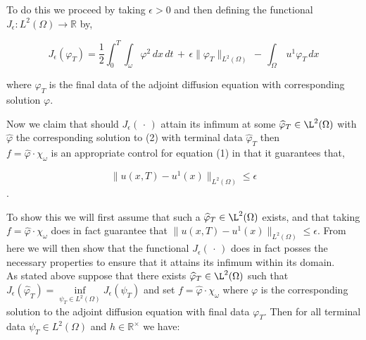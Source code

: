\documentclass[11pt]{article}
\begin{document}
To do this we proceed by taking $\epsilon >0$ and then defining the functional    $J_\epsilon :L^2(\Omega)\rightarrow \mathbb{R}$ by,
  
$$J_\epsilon(\varphi_T)=\dfrac{1}{2}\int_{0}^{T}\int_\omega\varphi^2\,dx\,dt\, +\,\epsilon\lVert \varphi_T \rVert_{L^2(\Omega)}\, -\,\int_\Omega\,u^1\varphi_T\,dx$$

where $\varphi_T$ is the final data of the adjoint diffusion equation with corresponding solution $\varphi$.

Now we claim that should $J_\epsilon (\,\cdot\,)$ attain its infimum at some $\widehat{\varphi}_T \in\L^2(\Omega)$ with $\widehat{\varphi}$ the corresponding solution to (2) with terminal data $\widehat{\varphi}_T$ then\\ $f=\widehat{\varphi} \cdot\chi_\omega$ is an appropriate control for equation (1) in that it guarantees that,

 $$\lVert u(x,T)-u^1(x) \rVert_{L^2(\Omega)}^{} \leq\epsilon$$.

To show this we will first assume that such a $\widehat{\varphi}_T \in\L^2(\Omega)$ exists, and that taking $f=\widehat{\varphi} \cdot\chi_\omega$ does in fact guarantee that $\lVert u(x,T)-u^1(x) \rVert_{L^2(\Omega)}^{} \leq\epsilon$. From here we will then show that the functional $J_\epsilon (\,\cdot\,)$ does in fact posses the necessary properties to ensure that it attains its infimum within its domain.\\


As stated above suppose that there exists $\widehat{\varphi}_T \in\L^2(\Omega)$ such that \\$J_\epsilon (\widehat{\varphi}_T) = \inf\limits_{\psi_T \in L^2(\Omega)} J_\epsilon (\psi_T)$ and set $f=\widehat{\varphi} \cdot\chi_\omega$ where $\varphi$ is the corresponding solution to the adjoint diffusion equation with final data $\varphi_T$. Then for all terminal data $\psi_T \in L^2(\Omega)$ and $h \in \mathbb{R^\times}$ we have:
\end{document}
